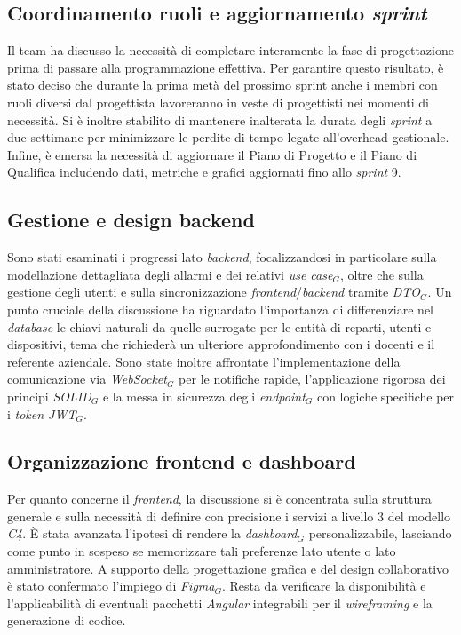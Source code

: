 \documentclass[10pt, letterpaper]{article}
\begin{document}
\subsection*{Coordinamento ruoli e aggiornamento \textit{sprint}}
Il team ha discusso la necessità di completare interamente la fase di progettazione prima di passare alla programmazione effettiva.
Per garantire questo risultato, è stato deciso che durante la prima metà del prossimo sprint anche i membri con ruoli diversi dal progettista lavoreranno in veste di progettisti nei momenti di necessità.
Si è inoltre stabilito di mantenere inalterata la durata degli \textit{sprint} a due settimane per minimizzare le perdite di tempo legate all'overhead gestionale.
Infine, è emersa la necessità di aggiornare il Piano di Progetto e il Piano di Qualifica includendo dati, metriche e grafici aggiornati fino allo \textit{sprint} 9.

\subsection*{Gestione e design backend}
Sono stati esaminati i progressi lato \textit{backend}, focalizzandosi in particolare sulla modellazione dettagliata
degli allarmi e dei relativi \textit{use case$_G$}, oltre che sulla gestione degli utenti e sulla sincronizzazione \textit{frontend}/\textit{backend} tramite \textit{DTO$_G$}.
Un punto cruciale della discussione ha riguardato l'importanza di differenziare nel \textit{database} le chiavi naturali da quelle surrogate per le entità di reparti,
utenti e dispositivi, tema che richiederà un ulteriore approfondimento con i docenti e il referente aziendale.
Sono state inoltre affrontate l'implementazione della comunicazione via \textit{WebSocket$_G$} per le notifiche rapide, l'applicazione rigorosa dei principi \textit{SOLID$_G$} e la messa in sicurezza degli \textit{endpoint$_G$} con logiche specifiche per i \textit{token JWT$_G$}.

\subsection*{Organizzazione frontend e dashboard}
Per quanto concerne il \textit{frontend}, la discussione si è concentrata sulla struttura generale e sulla necessità
di definire con precisione i servizi a livello 3 del modello \textit{C4}.
È stata avanzata l'ipotesi di rendere la \textit{dashboard$_G$} personalizzabile, lasciando come punto in sospeso se memorizzare tali preferenze lato utente o lato amministratore.
A supporto della progettazione grafica e del design collaborativo è stato confermato l'impiego di \textit{Figma$_G$}.
Resta da verificare la disponibilità e l'applicabilità di eventuali pacchetti \textit{Angular} integrabili per il \textit{wireframing} e la generazione di codice.
\end{document}
